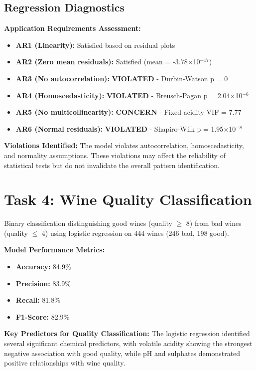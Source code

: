 \subsection{Regression Diagnostics}
\textbf{Application Requirements Assessment:}
\begin{itemize}
\item \textbf{AR1 (Linearity):} Satisfied based on residual plots
\item \textbf{AR2 (Zero mean residuals):} Satisfied (mean = -3.78$\times$10$^{-17}$)
\item \textbf{AR3 (No autocorrelation):} \textbf{VIOLATED} - Durbin-Watson p = 0
\item \textbf{AR4 (Homoscedasticity):} \textbf{VIOLATED} - Breusch-Pagan p = 2.04$\times$10$^{-6}$
\item \textbf{AR5 (No multicollinearity):} \textbf{CONCERN} - Fixed acidity VIF = 7.77
\item \textbf{AR6 (Normal residuals):} \textbf{VIOLATED} - Shapiro-Wilk p = 1.95$\times$10$^{-8}$
\end{itemize}

\textbf{Violations Identified:} The model violates autocorrelation, homoscedasticity, and normality assumptions. These violations may affect the reliability of statistical tests but do not invalidate the overall pattern identification.

\section{Task 4: Wine Quality Classification}

Binary classification distinguishing good wines (quality $\geq$ 8) from bad wines (quality $\leq$ 4) using logistic regression on 444 wines (246 bad, 198 good).

\textbf{Model Performance Metrics:}
\begin{itemize}
\item \textbf{Accuracy:} 84.9\%
\item \textbf{Precision:} 83.9\%
\item \textbf{Recall:} 81.8\%
\item \textbf{F1-Score:} 82.9\%
\end{itemize}

\textbf{Key Predictors for Quality Classification:}
The logistic regression identified several significant chemical predictors, with volatile acidity showing the strongest negative association with good quality, while pH and sulphates demonstrated positive relationships with wine quality.

